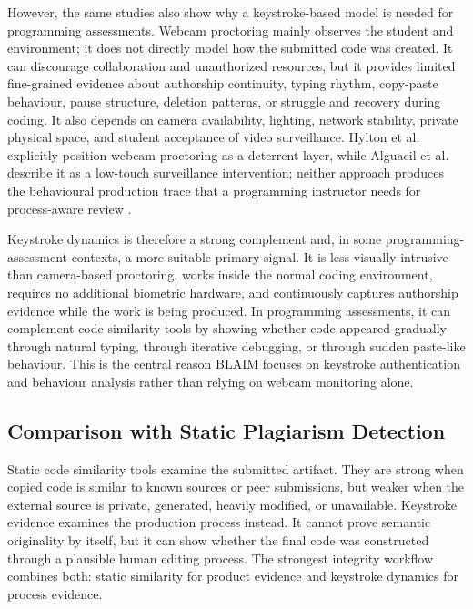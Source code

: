 However, the same studies also show why a keystroke-based model is needed for programming assessments. Webcam proctoring mainly observes the student and environment; it does not directly model how the submitted code was created. It can discourage collaboration and unauthorized resources, but it provides limited fine-grained evidence about authorship continuity, typing rhythm, copy-paste behaviour, pause structure, deletion patterns, or struggle and recovery during coding. It also depends on camera availability, lighting, network stability, private physical space, and student acceptance of video surveillance. Hylton et al. explicitly position webcam proctoring as a deterrent layer, while Alguacil et al. describe it as a low-touch surveillance intervention; neither approach produces the behavioural production trace that a programming instructor needs for process-aware review \cite{hylton2016webcam,alguacil2023academic}.

Keystroke dynamics is therefore a strong complement and, in some programming-assessment contexts, a more suitable primary signal. It is less visually intrusive than camera-based proctoring, works inside the normal coding environment, requires no additional biometric hardware, and continuously captures authorship evidence while the work is being produced. In programming assessments, it can complement code similarity tools by showing whether code appeared gradually through natural typing, through iterative debugging, or through sudden paste-like behaviour. This is the central reason BLAIM focuses on keystroke authentication and behaviour analysis rather than relying on webcam monitoring alone.

\subsection{Comparison with Static Plagiarism Detection}
\label{subsec:static-plagiarism}

Static code similarity tools examine the submitted artifact. They are strong when copied code is similar to known sources or peer submissions, but weaker when the external source is private, generated, heavily modified, or unavailable. Keystroke evidence examines the production process instead. It cannot prove semantic originality by itself, but it can show whether the final code was constructed through a plausible human editing process. The strongest integrity workflow combines both: static similarity for product evidence and keystroke dynamics for process evidence.

